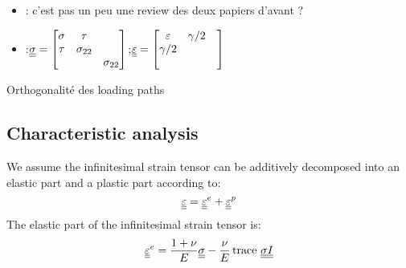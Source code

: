 \begin{itemize}
\item \cite{Ting73}: c'est pas un peu une review des deux papiers d'avant ?
\item \cite{Li_planeStress_EP}:${\underline{\underline{\sigma}}}=\left[\begin{matrix}\sigma & \tau & \\ \tau & \sigma_{22} & \\ & & \sigma_{22}\end{matrix}\right]$;${\underline{\underline{\varepsilon}}}=\left[\begin{matrix}\varepsilon & \gamma/2 & \\ \gamma/2 &  & \\ & & \end{matrix}\right]$
\end{itemize}

Orthogonalité des loading paths \cite{Clifton,Ting68}
\subsection{Characteristic analysis}
We assume the infinitesimal strain tensor can be additively decomposed into an elastic part and a plastic part according to:
\begin{equation}
  \label{eq:ch5_partition}
  {\underline{\underline{\varepsilon}}}={\underline{\underline{\varepsilon}}}^e+{\underline{\underline{\varepsilon}}}^p
\end{equation}
The elastic part of the infinitesimal strain tensor is:
\begin{equation}
  \label{eq:ch5_elastic_inverse}
  {\underline{\underline{\varepsilon}}}^e = \frac{1+\nu}{E} {\underline{\underline{\sigma}}} - \frac{\nu}{E} \operatorname{trace \,} {\underline{\underline{\sigma}}} {\underline{\underline{I}}}
\end{equation}

